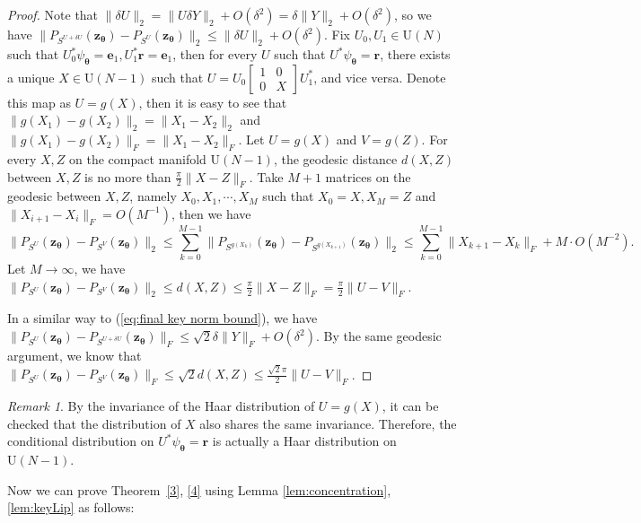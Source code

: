 \documentclass{amsart}
\theoremstyle{plain}
\theoremstyle{definition}
\theoremstyle{remark}
\newtheorem{remark}{Remark}
\newcommand{\thmref}[1]{Theorem~\ref{#1}}
\begin{document}
\begin{proof}
Note that $\|\delta U\|_2=\|U\delta Y\|_2+O(\delta^2)=\delta\|Y\|_2+O(\delta^2)$, so we have $\|P_{S^{U+\delta U}}(\bm{z}_{\bm\theta})-P_{S^U}(\bm{z}_{\bm\theta})\|_2\leq\|\delta U\|_2+O(\delta^2)$. Fix $U_0,U_1\in \mathrm U(N)$ such that $U_0^*\psi_{\bm\theta}=\bm e_1,U_1^*\bm r=\bm e_1$, then for every $U$ such that  $U^*\psi_{\bm\theta}=\bm r$, there exists a unique $X\in \mathrm U(N-1)$ such that $U=U_0\begin{bmatrix}
    1&0\\
    0& X
\end{bmatrix}U_1^*$, and vice versa. Denote this map as $U=g(X)$, then it is easy to see that $\|g(X_1)-g(X_2)\|_2=\|X_1-X_2\|_2$ and $\|g(X_1)-g(X_2)\|_F=\|X_1-X_2\|_F$. Let $U=g(X)$ and $V=g(Z)$.
For every $X,Z$ on the compact manifold $\mathrm U(N-1)$, the geodesic distance $d(X,Z)$ between $X,Z$ is no more than $\frac{\pi}{2}\|X-Z\|_F$. Take $M+1$ matrices on the geodesic between $X,Z$, namely $X_0,X_1,\cdots,X_{M}$ such that $X_0=X,X_{M}=Z$ and $\|X_{i+1}-X_i\|_F=O(M^{-1})$, then we have  
\[\|P_{S^U}(\bm z_{\bm\theta})-P_{S^V}(\bm z_{\bm\theta})\|_2\leq\sum\limits_{k=0}^{M-1}\|P_{S^{g(X_k)}}(\bm z_{\bm\theta})-P_{S^{g(X_{k+1})}}(\bm z_{\bm\theta})\|_2\leq \sum\limits_{k=0}^{M-1}\|X_{k+1}-X_{k}\|_F+M\cdot O(M^{-2}).\]
Let $M\to\infty$, we have $\|P_{S^U}(\bm z_{\bm\theta})-P_{S^V}(\bm z_{\bm\theta})\|_2\leq d(X,Z)\leq \frac{\pi}{2} \|X-Z\|_F=\frac{\pi}{2}\|U-V\|_F$.

In a similar way to (\ref{eq:final key norm bound}), we have $\|P_{S^U}(\bm z_{\bm\theta})-P_{S^{U+\delta U}}(\bm z_{\bm\theta})\|_F\leq \sqrt{2}\delta \|Y\|_F+O(\delta^2)$. By the same geodesic argument, we know that $\|P_{S^U}(\bm z_{\bm\theta})-P_{S^V}(\bm z_{\bm\theta})\|_F\leq \sqrt{2}d(X,Z)\leq\frac{\sqrt{2}\pi}{2}\|U-V\|_F$. 
\end{proof}
\begin{remark}
    By the invariance of the Haar distribution of $U=g(X)$, it can be checked that the distribution of $X$ also shares the same invariance. Therefore, 
the conditional distribution on $U^*\psi_{\bm\theta}=\bm r$ is actually a Haar distribution on $\mathrm U(N-1)$.
\end{remark}
Now we can prove \thmref{3}, \ref{4} using Lemma \ref{lem:concentration}, \ref{lem:keyLip} as follows:
\end{document}
